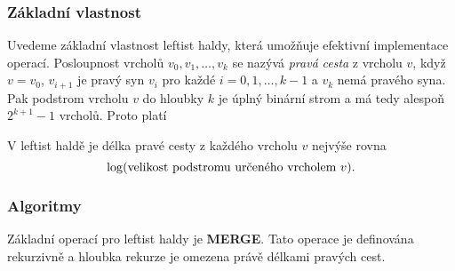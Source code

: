 \documentclass[a4paper,12pt]{article}
\begin{document}
\subsubsection{Základní vlastnost}

Uvedeme základní vlastnost leftist haldy, která 
umožňuje efektivní implementace operací. 
Posloupnost vrcholů $v_0,v_1,\dots,v_k$ se nazývá 
\emph{pravá} \emph{cesta} z vrcholu $v$, když $v=v_0$, $v_{i
+1}$ 
je pravý syn $v_i$ pro každé $i=0,1,\dots,k-1$ a $v_k$ nemá 
pravého syna. Pak podstrom vrcholu $v$ do hloubky $k$ je 
úplný binární strom a má tedy  
alespoň $2^{k+1}-1$ vrcholů. Proto platí 

\begin{tvrzeni}V leftist haldě je 
délka pravé cesty z každého vrcholu $v$ nejvýše rovna 
$$\log(\text{\rm velikost podstromu určeného vrcholem }v).$$
\end{tvrzeni}

\subsubsection{Algoritmy}

Základní operací pro leftist haldy je {\bf MERGE}. Tato 
operace je definována rekurzivně a hloubka rekurze je omezena 
právě délkami pravých cest.
\end{document}
